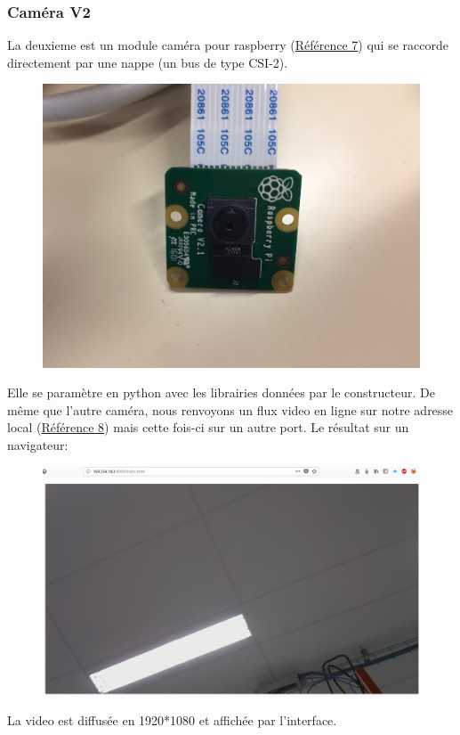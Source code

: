 \documentclass[a4paper,11pt]{report}
\begin{document}
				\subsubsection{Caméra V2}
					La deuxieme est un module caméra pour raspberry (\href{https://www.mouser.fr/ProductDetail/SparkFun/DEV-14028?qs=sGAEpiMZZMsB9HsreUc \%252biQuTz4\%2fXD\%2fVgeee971KrtC4\%3d}{Référence 7}) qui se raccorde directement par une nappe (un bus de type CSI-2). 
					\begin{figure}[!h]
					\begin{center}
						\includegraphics[scale=0.1]{Photos/Camera21.jpg}
					\end{center}
				\end{figure}
				\newline Elle se paramètre en python avec les librairies données par le constructeur. De même que l'autre caméra, nous renvoyons un flux video en ligne sur notre adresse local (\href{http://169.254.14.03:8000/}{Référence 8}) mais cette fois-ci sur un autre port.
				\newline
				\newline Le résultat sur un navigateur:
					\begin{figure}[!h]
					\begin{center}
						\includegraphics[scale=0.4]{Photos/Camera2.png}
					\end{center}
				\end{figure}
				\newline La video est diffusée en 1920*1080 et affichée par l'interface.
				
\end{document}

